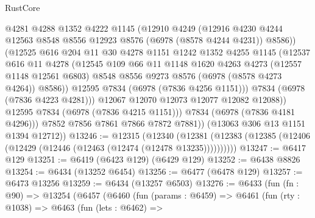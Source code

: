 \begin{lexlean}{RustCore}
\begin{coremodule}
                    @4281
                    @4288
                    @1352
                    @4222
                    @1145
                    (@12910
                      @4249
                      (@12916
                        @4230
                        @4244
                        @12563
                        @8548
                        @8556
                        @12923
                        @8576
                        (@6978 (@8578 @4244 @4231))
                        @8586))
                    (@12525
                      @616
                      @204
                      @11
                      @30
                      @4278
                      @1151
                      @1242
                      @1352
                      @4255
                      @1145
                      (@12537
                        @616
                        @11
                        @4278
                        (@12545
                          @109
                          @66
                          @11
                          @1148
                          @1620
                          @4263
                          @4273
                          (@12557 @1148 @12561 @6803)
                          @8548
                          @8556
                          @9273
                          @8576
                          (@6978 (@8578 @4273 @4264))
                          @8586))
                      @12595
                      @7834
                      (@6978 (@7836 @4256 @1151)))
                    @7834
                    (@6978 (@7836 @4223 @4281)))
                  @12067
                  @12070
                  @12073
                  @12077
                  @12082
                  @12088))
              @12595
              @7834
              (@6978 (@7836 @4215 @1151)))
            @7834
            (@6978 (@7836 @4181 @4296)))
          @7852
          @7856
          @7861
          @7866
          @7872
          @7881))
      (@13063 @306 @13 @1151 @1394 @12712))
@13246 := @12315
    (@12340 (@12381 (@12383 (@12385 (@12406 (@12429 (@12446 (@12463 (@12474 (@12478 @13235))))))))))
@13247 := @6417 @129
@13251 := @6419 (@6423 @129) (@6429 @129)
@13252 := @6438 @8826
@13254 := @6434 (@13252 @6454)
@13256 := @6477 (@6478 @129)
@13257 := @6473 @13256
@13259 := @6434 (@13257 @6503)
@13276 := @6433
    (fun (fn : @90) =>
    @13254
      (@6457
        (@6460
          (fun (params : @6459) =>
          @6461
            (fun (rty : @1038) =>
            @6463
              (fun (lets : @6462) =>

\end{coremodule}
\end{lexlean}

